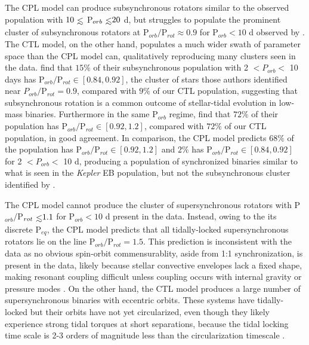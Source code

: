 \documentclass[twocolumn]{aastex61}
\def\lsim{~\rlap{$<$}{\lower 1.0ex\hbox{$\sim$}}}
\newcommand{\kepler}[0]{\textit{Kepler}\xspace}
\begin{document}
The CPL model can produce subsynchronous rotators similar to the observed population with $10 \lsim$ P$_{orb} \lsim 20$ d, but struggles to populate the prominent cluster of subsynchronous rotators at P$_{orb}/$P$_{rot} \approx 0.9$ for P$_{orb} < 10$ d observed by \citet{Lurie2017}.  The CTL model, on the other hand, populates a much wider swath of parameter space than the CPL model can, qualitatively reproducing many clusters seen in the \citet{Lurie2017} data. \citet{Lurie2017} find that $15\%$ of their subsynchronous population with 2 $< P_{orb} <$ 10 days has P$_{orb}/$P$_{rot} \in [0.84, 0.92]$, the cluster of stars those authors identified near $P_{orb}/$P$_{rot} = 0.9$, compared with $9\%$ of our CTL population, suggesting that subsynchronous rotation is a common outcome of stellar-tidal evolution in low-mass binaries. Furthermore in the same P$_{orb}$ regime, \citet{Lurie2017} find that $72\%$ of their population has P$_{orb}/$P$_{rot} \in [0.92, 1.2]$, compared with $72\%$ of our CTL population, in good agreement. In comparison, the CPL model predicts $68\%$ of the population has P$_{orb}/$P$_{rot} \in [0.92, 1.2]$ and $2\%$ has P$_{orb}/$P$_{rot} \in [0.84, 0.92]$ for 2 $< P_{orb} < $ 10 d, producing a population of synchronized binaries similar to what is seen in the \kepler EB population, but not the subsynchronous cluster identified by \citet{Lurie2017}.

The CPL model cannot produce the cluster of supersynchronous rotators with P$_{orb}/$P$_{rot} \lsim 1.1$ for P$_{orb} < 10$ d present in the \citet{Lurie2017} data. Instead, owing to the its discrete P$_{eq}$, the CPL model predicts that all tidally-locked supersynchronous rotators lie on the line P$_{orb}/$P$_{rot} = 1.5$.  This prediction is inconsistent with the data as no obvious spin-orbit commensurablity, aside from 1:1 synchronization, is present in the \citet{Lurie2017} data, likely because stellar convective envelopes lack a fixed shape, making resonant coupling difficult unless coupling occurs with internal gravity or pressure modes \citep{Burkart2014,Lurie2017}. On the other hand, the CTL model produces a large number of supersynchronous binaries with eccentric orbits.  These systems have tidally-locked but their orbits have not yet circularized, even though they likely experience strong tidal torques at short separations, because the tidal locking time scale is 2-3 orders of magnitude less than the circularization timescale \citep{Mazeh2008}.  
\end{document}
